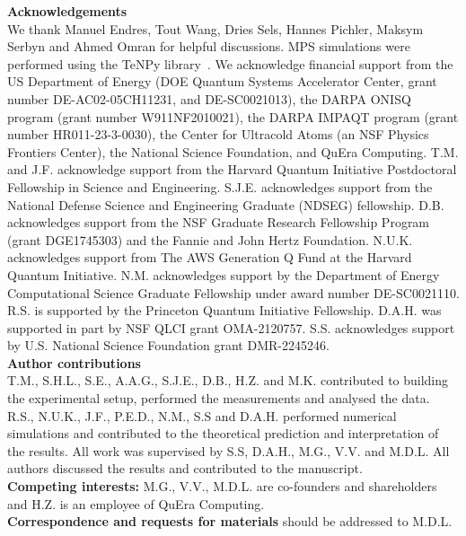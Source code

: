 \documentclass[reprint,twocolumn,secnumarabic,amssymb, aps, prx]{revtex4-2}
\begin{document}
\noindent\textbf{Acknowledgements}\\ 
We thank Manuel Endres, Tout Wang, Dries Sels, Hannes Pichler, Maksym Serbyn and Ahmed Omran for helpful discussions.
MPS simulations were performed using the TeNPy library~\cite{hauschild2018tenpy}.
We acknowledge financial support from the US Department of Energy (DOE Quantum Systems Accelerator Center, grant number DE-AC02-05CH11231, and DE-SC0021013),
the DARPA ONISQ program (grant number W911NF2010021), the DARPA IMPAQT program (grant number HR011-23-3-0030), the Center for Ultracold Atoms (an NSF Physics Frontiers Center), the National Science Foundation, 
and  QuEra Computing.
T.M. and J.F. acknowledge support from the Harvard Quantum Initiative Postdoctoral Fellowship in Science and Engineering. S.J.E. acknowledges support from the National Defense Science and Engineering Graduate (NDSEG) fellowship. D.B. acknowledges support from the NSF Graduate Research Fellowship Program (grant DGE1745303) and the Fannie and John Hertz Foundation.  N.U.K. acknowledges support from The AWS Generation Q Fund at the Harvard Quantum Initiative. N.M. acknowledges support by the Department of Energy Computational Science Graduate Fellowship under award number DE-SC0021110.  R.S. is supported by the Princeton Quantum Initiative Fellowship. D.A.H. was supported in part by NSF QLCI grant OMA-2120757. S.S. acknowledges support by U.S. National Science Foundation grant DMR-2245246.
\\

\noindent\textbf{Author contributions} \\
T.M., S.H.L., S.E., A.A.G., S.J.E., D.B., H.Z. and M.K. contributed to building the experimental setup, performed the measurements and analysed the data.
R.S., N.U.K., J.F., P.E.D., N.M., S.S and D.A.H. performed  numerical simulations and contributed to the theoretical prediction and interpretation of the results.
All work was supervised by S.S, D.A.H., M.G., V.V. and M.D.L. All authors discussed the results and contributed to the manuscript. 
\\

\noindent\textbf{Competing interests:} M.G., V.V., M.D.L. are co-founders and shareholders and H.Z. is an employee of QuEra Computing.\\ 

\noindent\textbf{Correspondence and requests for materials} should be addressed to M.D.L.\\
\end{document}
